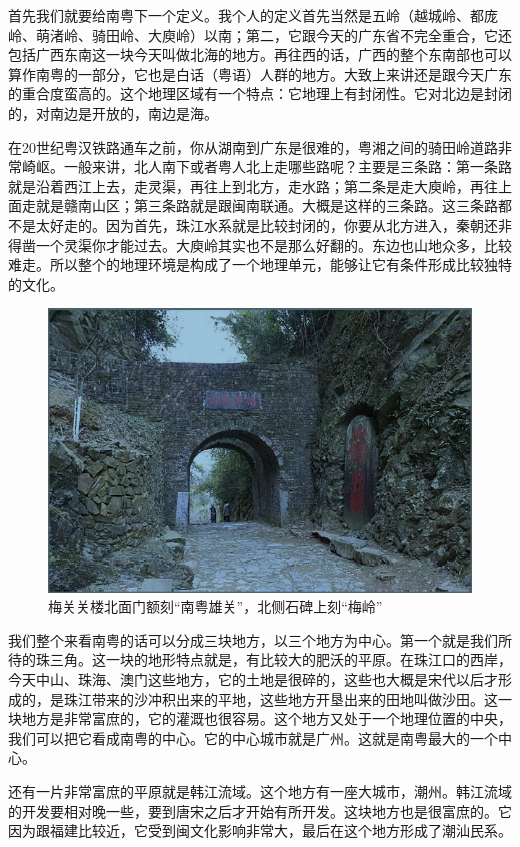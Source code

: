 首先我们就要给南粤下一个定义。我个人的定义首先当然是五岭（越城岭、都庞岭、萌渚岭、骑田岭、大庾岭）以南；第二，它跟今天的广东省不完全重合，它还包括广西东南这一块今天叫做北海的地方。再往西的话，广西的整个东南部也可以算作南粤的一部分，它也是白话（粤语）人群的地方。大致上来讲还是跟今天广东的重合度蛮高的。这个地理区域有一个特点：它地理上有封闭性。它对北边是封闭的，对南边是开放的，南边是海。

在20世纪粤汉铁路通车之前，你从湖南到广东是很难的，粤湘之间的骑田岭道路非常崎岖。一般来讲，北人南下或者粤人北上走哪些路呢？主要是三条路：第一条路就是沿着西江上去，走灵渠，再往上到北方，走水路；第二条是走大庾岭，再往上面走就是赣南山区；第三条路就是跟闽南联通。大概是这样的三条路。这三条路都不是太好走的。因为首先，珠江水系就是比较封闭的，你要从北方进入，秦朝还非得凿一个灵渠你才能过去。大庾岭其实也不是那么好翻的。东边也山地众多，比较难走。所以整个的地理环境是构成了一个地理单元，能够让它有条件形成比较独特的文化。

\begin{figure}
	\centering
	\includegraphics[width=\textwidth]{images/image-1}
	\caption{梅关关楼北面门额刻“南粤雄关”，北侧石碑上刻“梅岭”}
\end{figure}


我们整个来看南粤的话可以分成三块地方，以三个地方为中心。第一个就是我们所待的珠三角。这一块的地形特点就是，有比较大的肥沃的平原。在珠江口的西岸，今天中山、珠海、澳门这些地方，它的土地是很碎的，这些也大概是宋代以后才形成的，是珠江带来的沙冲积出来的平地，这些地方开垦出来的田地叫做沙田。这一块地方是非常富庶的，它的灌溉也很容易。这个地方又处于一个地理位置的中央，我们可以把它看成南粤的中心。它的中心城市就是广州。这就是南粤最大的一个中心。

还有一片非常富庶的平原就是韩江流域。这个地方有一座大城市，潮州。韩江流域的开发要相对晚一些，要到唐宋之后才开始有所开发。这块地方也是很富庶的。它因为跟福建比较近，它受到闽文化影响非常大，最后在这个地方形成了潮汕民系。

